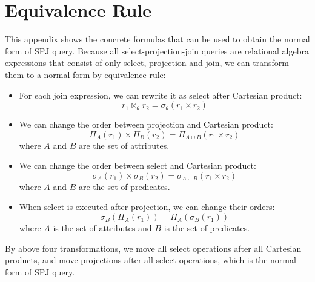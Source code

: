 \section{Equivalence Rule}
    This appendix shows the concrete formulas that can be used to obtain the normal form of SPJ query. Because all select-projection-join queries are relational algebra expressions that consist of only select, projection and join, we can transform them to a normal form by equivalence rule:\par
    \begin{itemize}[leftmargin = 15pt]
        \item For each join expression, we can rewrite it as select after Cartesian product:
        $$ r_1 \bowtie_{\theta} r_2=\sigma_{\theta}(r_1 \times r_2) $$
        \item We can change the order between projection and Cartesian product:
        $$ \Pi_{A}(r_1) \times \Pi_{B}(r_2)=\Pi_{A \cup B}(r_1 \times r_2) $$
        where $A$ and $B$ are the set of attributes.
        \item We can change the order between select and Cartesian product:
        $$ \sigma_{A}(r_1) \times \sigma_{B}(r_2)=\sigma_{A \cup B}(r_1 \times r_2) $$
        where $A$ and $B$ are the set of predicates.
        \item When select is executed after projection, we can change their orders:
        $$ \sigma_{B}(\Pi_{A}(r_1))=\Pi_{A}(\sigma_{B}(r_1)) $$
        where $A$ is the set of attributes and $B$ is the set of predicates.
    \end{itemize}\par
    By above four transformations, we move all select operations after all Cartesian products, and move projections after all select operations, which is the normal form of SPJ query.